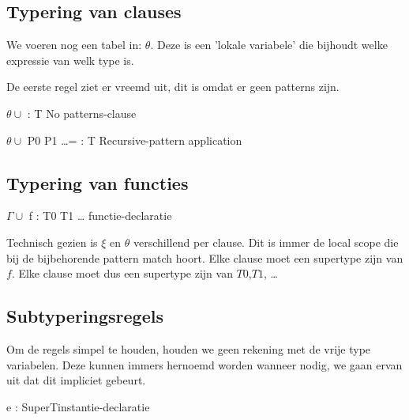\subsection{Typering van clauses}
We voeren nog een tabel in: $\theta$. Deze is een 'lokale variabele' die
bijhoudt welke expressie van welk type is.

De eerste regel ziet er vreemd uit, dit is omdat er geen patterns zijn.

	{$\theta \cup$  : T}
	{No patterns-clause}

{$\theta \cup $ P0 P1 \ldots =  : T} {Recursive-pattern application}


\subsection{Typering van functies}


{$\Gamma \cup $ f : T0 \amp T1 \amp \ldots} {functie-declaratie}

Technisch gezien is $\xi$ en $\theta$ verschillend per clause. Dit is immer de local scope die bij de bijbehorende pattern match hoort.
Elke clause moet een supertype zijn van $f$. Elke clause moet dus een supertype zijn van $T0$,$T1$, \ldots

\subsection{Subtyperingsregels}

Om de regels simpel te houden, houden we geen rekening met de vrije type
variabelen. Deze kunnen immers hernoemd worden wanneer nodig, we gaan ervan uit
dat dit impliciet gebeurt.

{e : SuperT}{instantie-declaratie}

